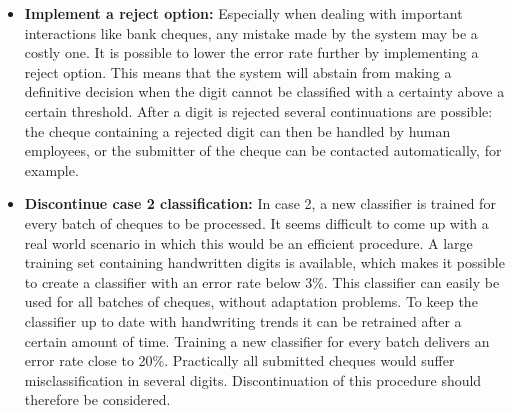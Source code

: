 \begin{itemize}
	\item \textbf{Implement a reject option:} Especially when dealing with important interactions like bank cheques, any mistake made by the system may be a costly one. It is possible to lower the error rate further by implementing a reject option. This means that the system will abstain from making a definitive decision when the digit cannot be classified with a certainty above a certain threshold. After a digit is rejected several continuations are possible: the cheque containing a rejected digit can then be handled by human employees, or the submitter of the cheque can be contacted automatically, for example.	
	\item \textbf{Discontinue case 2 classification:} In case 2, a new classifier is trained for every batch of cheques to be processed. It seems difficult to come up with a real world scenario in which this would be an efficient procedure. A large training set containing handwritten digits is available, which makes it possible to create a classifier with an error rate below 3\%. This classifier can easily be used for all batches of cheques, without adaptation problems. To keep the classifier up to date with handwriting trends it can be retrained after a certain amount of time. 
	Training a new classifier for every batch delivers an error rate close to 20\%. Practically all submitted cheques would suffer misclassification in several digits. Discontinuation of this procedure should therefore be considered.
	

\end{itemize}
